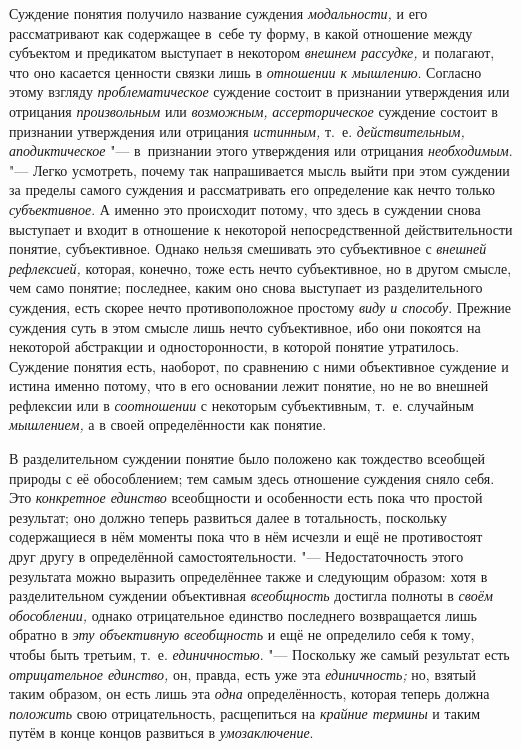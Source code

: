 Суждение понятия получило название суждения
{\em модальности,} и его
рассматривают как содержащее в~себе ту форму, в какой отношение между
субъектом и предикатом выступает в некотором
{\em внешнем рассудке,} и
полагают, что оно касается ценности связки лишь в
{\em отношении к мышлению}.
Согласно этому взгляду
{\em проблематическое}
суждение состоит в признании утверждения или отрицания
{\em произвольным} или
{\em возможным,}
{\em ассерторическое}
суждение состоит в признании утверждения или отрицания
{\em истинным,} т.~е.
{\em действительным,}
{\em аподиктическое} "--- в~признании этого утверждения или отрицания
{\em необходимым}. "---
Легко усмотреть, почему так напрашивается мысль выйти при
этом суждении за пределы самого суждения и рассматривать его определение
как нечто только {\em субъективное}.
А именно это происходит потому, что здесь в суждении снова
выступает и входит в отношение к некоторой непосредственной
действительности понятие, субъективное. Однако нельзя смешивать это
субъективное с {\em внешней
рефлексией,} которая, конечно, тоже есть нечто субъективное,
но в другом смысле, чем само понятие; последнее, каким оно снова выступает
из разделительного суждения, есть скорее нечто противоположное простому
{\em виду и способу}.
Прежние суждения суть в этом смысле лишь нечто субъективное,
ибо они покоятся на некоторой абстракции и односторонности, в которой
понятие утратилось. Суждение понятия есть, наоборот, по сравнению с ними
объективное суждение и истина именно потому, что в его основании лежит
понятие, но не во внешней рефлексии или в
{\em соотношении} с
некоторым субъективным, т.~е. случайным
{\em мышлением,} а в
своей определённости как понятие.

В разделительном суждении понятие было положено как тождество
всеобщей природы с её обособлением; тем самым здесь отношение суждения
сняло себя. Это {\em конкретное
единство} всеобщности и особенности есть пока что простой
результат; оно должно теперь развиться далее в тотальность, поскольку
содержащиеся в нём моменты пока что в нём исчезли и ещё не противостоят
друг другу в определённой самостоятельности. "---
Недостаточность этого результата можно выразить определённее
также и следующим образом: хотя в разделительном суждении объективная
{\em всеобщность}
достигла полноты в
{\em своём обособлении,}
однако отрицательное единство последнего возвращается лишь
обратно в {\em эту объективную
всеобщность} и ещё не определило себя к тому, чтобы быть
третьим, т.~е. {\em единичностью}. "---
Поскольку же самый результат есть
{\em отрицательное единство,}
он, правда, есть уже эта
{\em единичность;} но,
взятый таким образом, он есть лишь эта
{\em одна}
определённость, которая теперь должна
{\em положить} свою
отрицательность, расщепиться на
{\em крайние термины} и
таким путём в конце концов развиться в
{\em умозаключение}.

